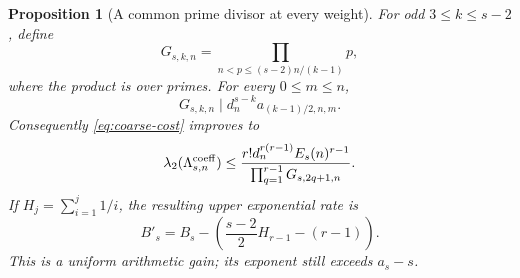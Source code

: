 \documentclass[11pt]{article}
\newtheorem{proposition}[theorem]{Proposition}
\theoremstyle{remark}
\begin{document}
\begin{proposition}[A common prime divisor at every weight]
\label{prop:uniform-prime-divisor}
For odd \(3\le k\le s-2\), define
\[
 G_{s,k,n}=\prod_{n<p\le (s-2)n/(k-1)}p,
\]
where the product is over primes. For every \(0\le m\le n\),
\begin{equation}
 G_{s,k,n}\mid d_n^{s-k}a_{(k-1)/2,n,m}.
 \label{eq:uniform-prime-divisor}
\end{equation}
Consequently \eqref{eq:coarse-cost} improves to
\begin{equation}
 \lambda_2(\Lambda^{\rm coeff}_{s,n})
 \le\frac{r!d_n^{r(r-1)}E_s(n)^{r-1}}
              {\prod_{q=1}^{r-1}G_{s,2q+1,n}}.
 \label{eq:prime-refined-cost}
\end{equation}
If \(H_j=\sum_{i=1}^j1/i\), the resulting upper exponential rate is
\[
 B'_s=B_s-\left(\frac{s-2}{2}H_{r-1}-(r-1)\right).
\]
This is a uniform arithmetic gain; its exponent still exceeds \(a_s-s\).
\end{proposition}
\end{document}
